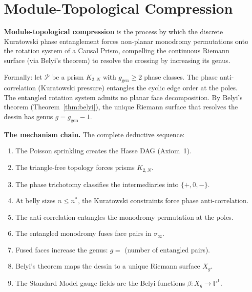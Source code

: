 \section{Module-Topological Compression}
\label{sec:compresion}

\begin{definition}
\label{def:compresion}
\textbf{Module-topological compression} is the process by which the
discrete Kuratowski phase entanglement forces non-planar monodromy
permutations onto the rotation system of a Causal Prism,
compelling the continuous Riemann surface (via Belyi's theorem)
to resolve the crossing by increasing its genus.

Formally: let $\mathcal{P}$ be a prism $K_{2,N}$ with
$g_{\mathrm{gen}} \ge 2$ phase classes. The phase anti-correlation
(Kuratowski pressure) entangles the cyclic edge order at the
poles. The entangled rotation system admits no planar face
decomposition. By Belyi's theorem
(Theorem~\ref{thm:belyi}), the unique Riemann surface that
resolves the dessin has genus $g = g_{\mathrm{gen}} - 1$.
\end{definition}

\noindent
\textbf{The mechanism chain.} The complete deductive sequence:
\begin{enumerate}
  \item The Poisson sprinkling creates the Hasse DAG (Axiom~1).
  \item The triangle-free topology forces prisms $K_{2,N}$.
  \item The phase trichotomy classifies the intermediaries into $\{+, 0, -\}$.
  \item At belly sizes $n \le n^*$, the Kuratowski constraints
        force phase anti-correlation.
  \item The anti-correlation entangles the monodromy permutation
        at the poles.
  \item The entangled monodromy fuses face pairs in
        $\sigma_\infty$.
  \item Fused faces increase the genus: $g =$ (number of entangled
        pairs).
  \item Belyi's theorem maps the dessin to a unique Riemann
        surface $X_g$.
  \item The Standard Model gauge fields are the Belyi functions
        $\beta \colon X_g \to \mathbb{P}^1$.
\end{enumerate}

